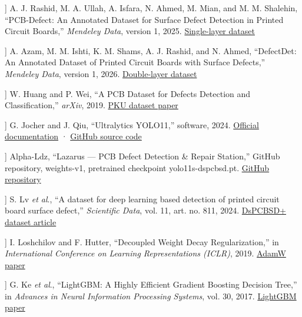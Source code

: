 \documentclass[conference]{IEEEtran}
\begin{document}
\begin{list}{}{\setlength{\leftmargin}{2em}\setlength{\labelwidth}{1.7em}\setlength{\itemsep}{.4ex}\footnotesize}

\item[[1]] A. J. Rashid, M. A. Ullah, A. Isfara, N. Ahmed, M. Mian, and M. M. Shalehin, “PCB-Defect: An Annotated Dataset for Surface Defect Detection in Printed Circuit Boards,” \textit{Mendeley Data}, version 1, 2025. \href{https://doi.org/10.17632/vdj74sngvn.1}{Single-layer dataset}

\item[[2]] A. Azam, M. M. Ishti, K. M. Shams, A. J. Rashid, and N. Ahmed, “DefectDet: An Annotated Dataset of Printed Circuit Boards with Surface Defects,” \textit{Mendeley Data}, version 1, 2026. \href{https://doi.org/10.17632/t9d9zs3bmb.1}{Double-layer dataset}

\item[[3]] W. Huang and P. Wei, “A PCB Dataset for Defects Detection and Classification,” \textit{arXiv}, 2019. \href{https://arxiv.org/abs/1901.08204}{PKU dataset paper}

\item[[4]] G. Jocher and J. Qiu, “Ultralytics YOLO11,” software, 2024. \href{https://docs.ultralytics.com/models/yolo11/}{Official documentation} · \href{https://github.com/ultralytics/ultralytics}{GitHub source code}

\item[[5]] Alpha-Ldz, “Lazarus — PCB Defect Detection \& Repair Station,” GitHub repository, weights-v1, pretrained checkpoint yolo11s-dspcbsd.pt. \href{https://github.com/Alpha-Ldz/lazarus}{GitHub repository}

\item[[6]] S. Lv \textit{et al}., “A dataset for deep learning based detection of printed circuit board surface defect,” \textit{Scientific Data}, vol. 11, art. no. 811, 2024. \href{https://doi.org/10.1038/s41597-024-03656-8}{DsPCBSD+ dataset article}

\item[[7]] I. Loshchilov and F. Hutter, “Decoupled Weight Decay Regularization,” in \textit{International Conference on Learning Representations (ICLR)}, 2019. \href{https://arxiv.org/abs/1711.05101}{AdamW paper}

\item[[8]] G. Ke \textit{et al}., “LightGBM: A Highly Efficient Gradient Boosting Decision Tree,” in \textit{Advances in Neural Information Processing Systems}, vol. 30, 2017. \href{https://proceedings.neurips.cc/paper/2017/hash/6449f44a102fde848669bdd9eb6b76fa-Abstract.html}{LightGBM paper}


\end{list}
\end{document}
